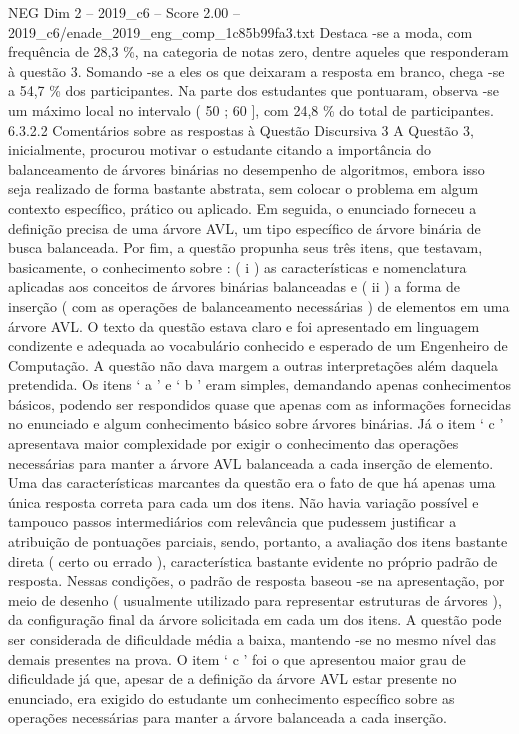 \begin{textsample}{NEG Dim 2 – 2019\_c6 – Score 2.00 – 2019\_c6/enade\_2019\_eng\_comp\_1c85b99fa3.txt}
Destaca -se a moda, com frequência de 28,3 \%, na categoria de notas zero, dentre aqueles que responderam à questão 3.
Somando -se a eles os que deixaram a resposta em branco, chega -se a 54,7 \% dos participantes.
Na parte dos estudantes que pontuaram, observa -se um máximo local no intervalo ( 50 ; 60 ], com 24,8 \% do total de participantes. 6.3.2.2 Comentários sobre as respostas à Questão Discursiva 3 A Questão 3, inicialmente, procurou motivar o estudante citando a importância do balanceamento de árvores binárias no desempenho de algoritmos, embora isso seja realizado de forma bastante abstrata, sem colocar o problema em algum contexto específico, prático ou aplicado.
Em seguida, o enunciado forneceu a definição precisa de uma árvore AVL, um tipo específico de árvore binária de busca balanceada.
Por fim, a questão propunha seus três itens, que testavam, basicamente, o conhecimento sobre : ( i ) as características e nomenclatura aplicadas aos conceitos de árvores binárias balanceadas e ( ii ) a forma de inserção ( com as operações de balanceamento necessárias ) de elementos em uma árvore AVL.
O texto da questão estava claro e foi apresentado em linguagem condizente e adequada ao vocabulário conhecido e esperado de um Engenheiro de Computação.
A questão não dava margem a outras interpretações além daquela pretendida.
Os itens ‘ a ’ e ‘ b ’ eram simples, demandando apenas conhecimentos básicos, podendo ser respondidos quase que apenas com as informações fornecidas no enunciado e algum conhecimento básico sobre árvores binárias.
Já o item ‘ c ’ apresentava maior complexidade por exigir o conhecimento das operações necessárias para manter a árvore AVL balanceada a cada inserção de elemento.
Uma das características marcantes da questão era o fato de que há apenas uma única resposta correta para cada um dos itens.
Não havia variação possível e tampouco passos intermediários com relevância que pudessem justificar a atribuição de pontuações parciais, sendo, portanto, a avaliação dos itens bastante direta ( certo ou errado ), característica bastante evidente no próprio padrão de resposta.
Nessas condições, o padrão de resposta baseou -se na apresentação, por meio de desenho ( usualmente utilizado para representar estruturas de árvores ), da configuração final da árvore solicitada em cada um dos itens.
A questão pode ser considerada de dificuldade média a baixa, mantendo -se no mesmo nível das demais presentes na prova.
O item ‘ c ’ foi o que apresentou maior grau de dificuldade já que, apesar de a definição da árvore AVL estar presente no enunciado, era exigido do estudante um conhecimento específico sobre as operações necessárias para manter a árvore balanceada a cada inserção.

\end{textsample}
